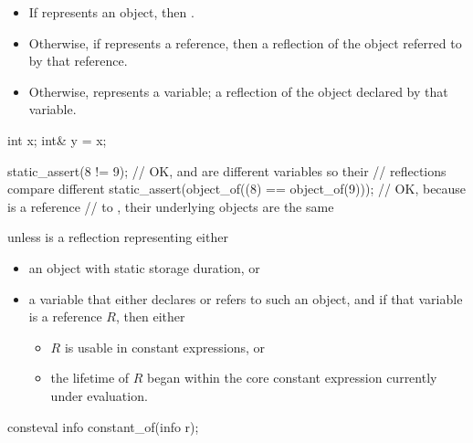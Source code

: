 \begin{itemdescr}
\pnum
\returns
\begin{itemize}
\item
  If  represents an object,
  then .
\item
  Otherwise, if  represents a reference,
  then a reflection of the object referred to by that reference.
\item
  Otherwise,  represents a variable;
  a reflection of the object declared by that variable.
\end{itemize}
\begin{example}
\begin{codeblock}
int x;
int& y = x;

static_assert(^^x != ^^y);                          // OK,  and  are different variables so their
                                                    // reflections compare different
static_assert(object_of((^^x) == object_of(^^y)));  // OK, because  is a reference
                                                    // to , their underlying objects are the same
\end{codeblock}
\end{example}

\pnum
\throws
{} unless
 is a reflection representing either
\begin{itemize}
\item
  an object with static storage duration, or
\item
  a variable that either declares or refers to such an object,
  and if that variable is a reference $R$, then either
  \begin{itemize}
  \item
    $R$ is usable in constant expressions, or
  \item
    the lifetime of $R$ began within the core constant expression
    currently under evaluation.
  \end{itemize}
\end{itemize}
\end{itemdescr}

%
\begin{itemdecl}
consteval info constant_of(info r);
\end{itemdecl}

